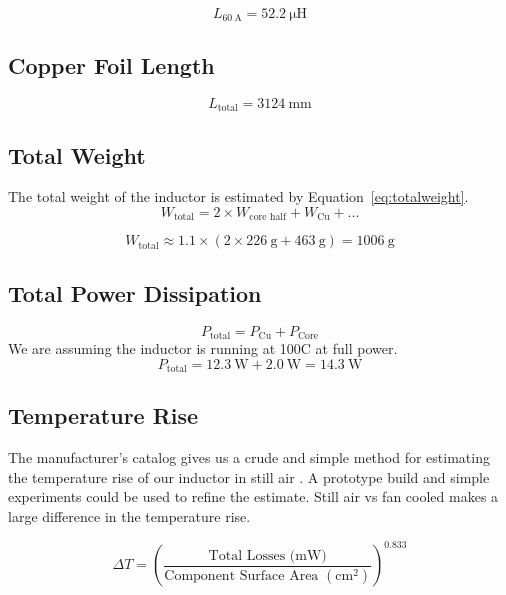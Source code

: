 \documentclass{article}
\begin{document}
\begin{equation}
L_{\SI{60}{\ampere}} = \SI{52.2}{\micro\henry}
\end{equation}

\subsection{Copper Foil Length}
\begin{equation}
L_{\text{total}} = \SI{3124}{\milli\meter}
\end{equation}

\subsection{Total Weight}
The total weight of the inductor is estimated by Equation~\eqref{eq:totalweight}.
\begin{equation}
W_\text{total} = 2 \times W_\text{core half} + W_\text{Cu} + \text{...}
\end{equation}

\begin{equation}
\label{eq:totalweight}
W_\text{total} \approx 1.1 \times (2 \times \SI{226}{\gram} + \SI{463}{\gram}) = \SI{1006}{\gram}
\end{equation}

\subsection{Total Power Dissipation}
\begin{equation}
P_\text{total} = P_\text{Cu} + P_\text{Core}
\end{equation}
We are assuming the inductor is running at 100C at full power.
\begin{equation}
P_\text{total} = \SI{12.3}{\watt} + \SI{2.0}{\watt} = \SI{14.3}{\watt}
\end{equation}

\subsection{Temperature Rise}
The manufacturer's catalog gives us a crude and simple method for estimating the temperature rise of our inductor in still air \cite[p. 20]{magincPowderCat2024}.
A prototype build and simple experiments could be used to refine the estimate.
Still air vs fan cooled makes a large difference in the temperature rise.

\begin{equation}
\Delta T = (\frac{\text{Total Losses (mW)}}{\text{Component Surface Area }(\text{cm}^2)})^{0.833}
\end{equation}
\end{document}
